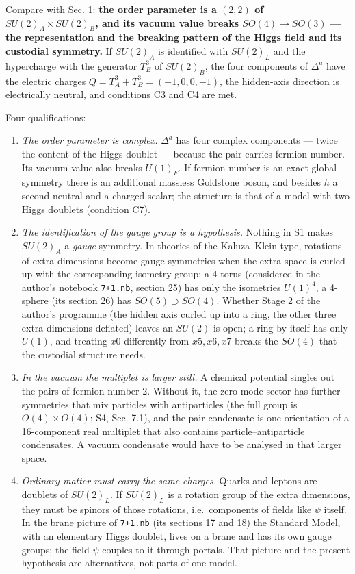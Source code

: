 \documentclass[
  10pt,
]{article}
\providecommand{\tightlist}{%
  \setlength{\itemsep}{0pt}\setlength{\parskip}{0pt}}
\begin{document}
Compare with Sec. 1: \textbf{the order parameter is a \((2,2)\) of
\(SU(2)_A\times SU(2)_B\), and its vacuum value breaks
\(SO(4)\to SO(3)\) --- the representation and the breaking pattern of
the Higgs field and its custodial symmetry.} If \(SU(2)_A\) is
identified with \(SU(2)_L\) and the hypercharge with the generator
\(T^3_B\) of \(SU(2)_B\), the four components of \(\Delta^a\) have the
electric charges \(Q=T^3_A+T^3_B=(+1,0,0,-1)\), the hidden-axis
direction is electrically neutral, and conditions C3 and C4 are met.

Four qualifications:

\begin{enumerate}
\def\labelenumi{\arabic{enumi}.}
\tightlist
\item
  \emph{The order parameter is complex.} \(\Delta^a\) has four complex
  components --- twice the content of the Higgs doublet --- because the
  pair carries fermion number. Its vacuum value also breaks \(U(1)_F\).
  If fermion number is an exact global symmetry there is an additional
  massless Goldstone boson, and besides \(h\) a second neutral and a
  charged scalar; the structure is that of a model with two Higgs
  doublets (condition C7).
\item
  \emph{The identification of the gauge group is a hypothesis.} Nothing
  in S1 makes \(SU(2)_A\) a \emph{gauge} symmetry. In theories of the
  Kaluza--Klein type, rotations of extra dimensions become gauge
  symmetries when the extra space is curled up with the corresponding
  isometry group; a 4-torus (considered in the author's notebook
  \texttt{7+1.nb}, section 25) has only the isometries \(U(1)^4\), a
  4-sphere (its section 26) has \(SO(5)\supset SO(4)\). Whether Stage 2
  of the author's programme (the hidden axis curled up into a ring, the
  other three extra dimensions deflated) leaves an \(SU(2)\) is open; a
  ring by itself has only \(U(1)\), and treating \(x0\) differently from
  \(x5,x6,x7\) breaks the \(SO(4)\) that the custodial structure needs.
\item
  \emph{In the vacuum the multiplet is larger still.} A chemical
  potential singles out the pairs of fermion number 2. Without it, the
  zero-mode sector has further symmetries that mix particles with
  antiparticles (the full group is \(O(4)\times O(4)\); S4, Sec. 7.1),
  and the pair condensate is one orientation of a 16-component real
  multiplet that also contains particle--antiparticle condensates. A
  vacuum condensate would have to be analysed in that larger space.
\item
  \emph{Ordinary matter must carry the same charges.} Quarks and leptons
  are doublets of \(SU(2)_L\). If \(SU(2)_L\) is a rotation group of the
  extra dimensions, they must be spinors of those rotations,
  i.e.~components of fields like \(\psi\) itself. In the brane picture
  of \texttt{7+1.nb} (its sections 17 and 18) the Standard Model, with
  an elementary Higgs doublet, lives on a brane and has its own gauge
  groups; the field \(\psi\) couples to it through portals. That picture
  and the present hypothesis are alternatives, not parts of one model.
\end{enumerate}
\end{document}
